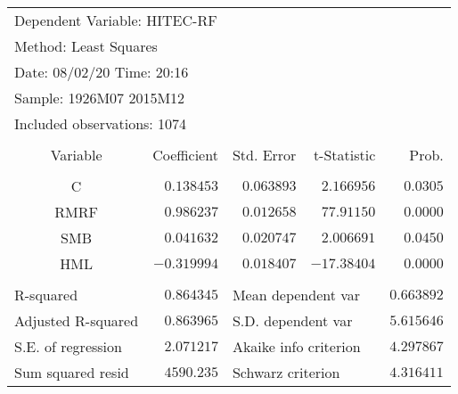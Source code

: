 \documentclass[12pt]{article}
\numberwithin{equation}{section} %
\begin{document}
\begin{table}[!htbp]
\centering
\begin{tabular}{lrrrr}
\multicolumn{3}{l}{Dependent Variable: HITEC-RF}&\multicolumn{1}{c}{}&\multicolumn{1}{c}{}\\
\multicolumn{2}{l}{Method: Least Squares}&\multicolumn{1}{c}{}&\multicolumn{1}{c}{}&\multicolumn{1}{c}{}\\
\multicolumn{2}{l}{Date: 08/02/20   Time: 20:16}&\multicolumn{1}{c}{}&\multicolumn{1}{c}{}&\multicolumn{1}{c}{}\\
\multicolumn{2}{l}{Sample: 1926M07 2015M12}&\multicolumn{1}{c}{}&\multicolumn{1}{c}{}&\multicolumn{1}{c}{}\\
\multicolumn{3}{l}{Included observations: 1074}&\multicolumn{1}{c}{}&\multicolumn{1}{c}{}\\
[4.5pt] \hline \\ [-4.5pt]
\multicolumn{1}{c}{Variable}&\multicolumn{1}{r}{Coefficient}&\multicolumn{1}{r}{Std. Error}&\multicolumn{1}{r}{t-Statistic}&\multicolumn{1}{r}{Prob.}\\
[4.5pt] \hline \\ [-4.5pt]
\multicolumn{1}{c}{C}&\multicolumn{1}{r}{$0.138453$}&\multicolumn{1}{r}{$0.063893$}&\multicolumn{1}{r}{$2.166956$}&\multicolumn{1}{r}{$0.0305$}\\
\multicolumn{1}{c}{RMRF}&\multicolumn{1}{r}{$0.986237$}&\multicolumn{1}{r}{$0.012658$}&\multicolumn{1}{r}{$77.91150$}&\multicolumn{1}{r}{$0.0000$}\\
\multicolumn{1}{c}{SMB}&\multicolumn{1}{r}{$0.041632$}&\multicolumn{1}{r}{$0.020747$}&\multicolumn{1}{r}{$2.006691$}&\multicolumn{1}{r}{$0.0450$}\\
\multicolumn{1}{c}{HML}&\multicolumn{1}{r}{$-0.319994$}&\multicolumn{1}{r}{$0.018407$}&\multicolumn{1}{r}{$-17.38404$}&\multicolumn{1}{r}{$0.0000$}\\
[4.5pt] \hline \\ [-4.5pt]
\multicolumn{1}{l}{R-squared}&\multicolumn{1}{r}{$0.864345$}&\multicolumn{2}{l}{Mean dependent var}&\multicolumn{1}{r}{$0.663892$}\\
\multicolumn{1}{l}{Adjusted R-squared}&\multicolumn{1}{r}{$0.863965$}&\multicolumn{2}{l}{S.D. dependent var}&\multicolumn{1}{r}{$5.615646$}\\
\multicolumn{1}{l}{S.E. of regression}&\multicolumn{1}{r}{$2.071217$}&\multicolumn{2}{l}{Akaike info criterion}&\multicolumn{1}{r}{$4.297867$}\\
\multicolumn{1}{l}{Sum squared resid}&\multicolumn{1}{r}{$4590.235$}&\multicolumn{2}{l}{Schwarz criterion}&\multicolumn{1}{r}{$4.316411$}\\

\end{tabular}
\end{table}
\end{document}

